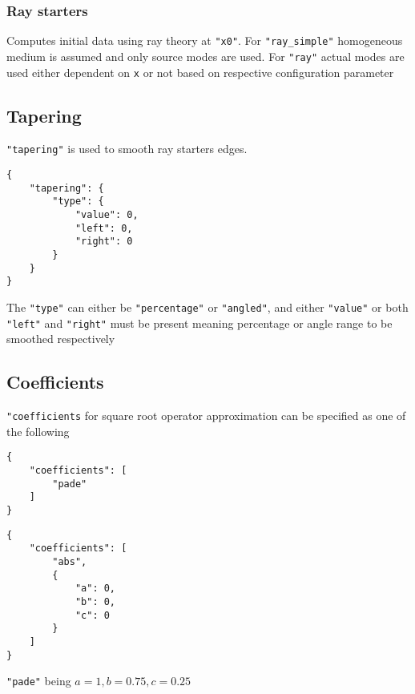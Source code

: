 \documentclass[12pt]{extarticle}
\newcommand{\code}[1]{\colorbox{gray!10}{\texttt{#1}}}
\begin{document}
            \subsubsection{Ray starters}
                \par Computes initial data using ray theory at \code{"x0"}. For \code{"ray_simple"} homogeneous medium is assumed and only source modes are used. For \code{"ray"} actual modes are used either dependent on \code{x} or not based on respective configuration parameter
        \subsection{Tapering}
            \par \code{"tapering"} is used to smooth ray starters edges.
            \begin{verbatim}
{
    "tapering": {
        "type": {
            "value": 0,
            "left": 0,
            "right": 0
        }
    }
}
            \end{verbatim}
            The \code{"type"} can either be \code{"percentage"} or \code{"angled"}, and either \code{"value"} or both \code{"left"} and \code{"right"} must be present meaning percentage or angle range to be smoothed respectively
        \subsection{Coefficients}
            \par \code{"coefficients} for square root operator approximation can be specified as one of the following
            \begin{multicols}{2}
                \begin{verbatim}
{
    "coefficients": [
        "pade"
    ]
}
                \end{verbatim}
                \columnbreak
                \begin{verbatim}
{
    "coefficients": [
        "abs",
        {
            "a": 0,
            "b": 0,
            "c": 0
        }
    ]
}
                \end{verbatim}
            \end{multicols}
            \code{"pade"} being $a=1, b=0.75, c=0.25$
\end{document}
